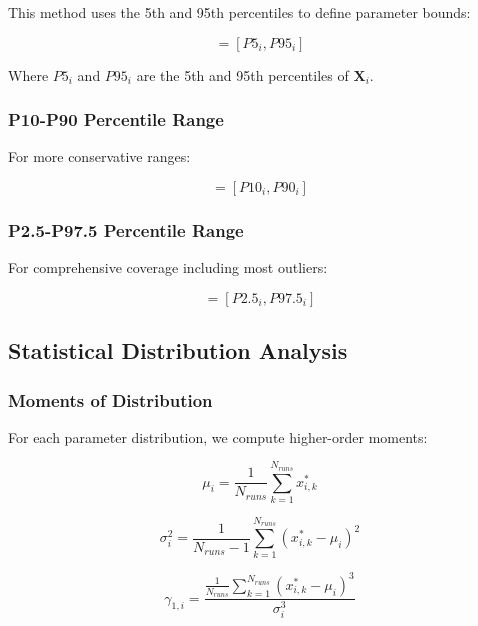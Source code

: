 \documentclass[../main.tex]{subfiles}
\begin{document}
This method uses the 5th and 95th percentiles to define parameter bounds:

\begin{equation}
[x_i^{min}, x_i^{max}] = [P5_i, P95_i]
\label{eq:p5_p95}
\end{equation}

Where $P5_i$ and $P95_i$ are the 5th and 95th percentiles of $\mathbf{X}_i$.

\subsubsection{P10-P90 Percentile Range}

For more conservative ranges:

\begin{equation}
[x_i^{min}, x_i^{max}] = [P10_i, P90_i]
\label{eq:p10_p90}
\end{equation}

\subsubsection{P2.5-P97.5 Percentile Range}

For comprehensive coverage including most outliers:

\begin{equation}
[x_i^{min}, x_i^{max}] = [P2.5_i, P97.5_i]
\label{eq:p2p97}
\end{equation}

\subsection{Statistical Distribution Analysis}

\subsubsection{Moments of Distribution}

For each parameter distribution, we compute higher-order moments:

\begin{equation}
\mu_i = \frac{1}{N_{runs}} \sum_{k=1}^{N_{runs}} x_{i,k}^*
\label{eq:mean}
\end{equation}

\begin{equation}
\sigma_i^2 = \frac{1}{N_{runs}-1} \sum_{k=1}^{N_{runs}} (x_{i,k}^* - \mu_i)^2
\label{eq:variance}
\end{equation}

\begin{equation}
\gamma_{1,i} = \frac{\frac{1}{N_{runs}} \sum_{k=1}^{N_{runs}} (x_{i,k}^* - \mu_i)^3}{\sigma_i^3}
\label{eq:skewness}
\end{equation}
\end{document}

